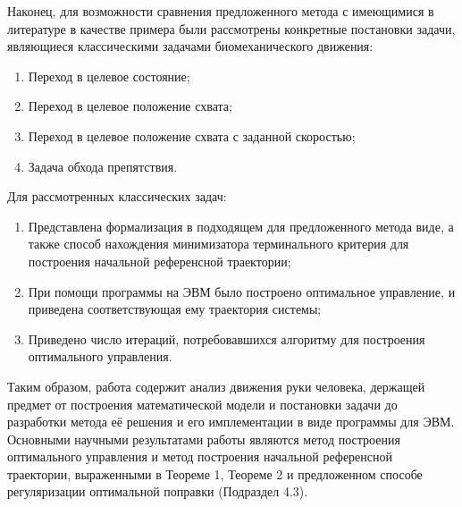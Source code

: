\documentclass[../doc.tex]{subfiles}
\begin{document}
    Наконец, для возможности сравнения предложенного метода с имеющимися в литературе в качестве примера были
        рассмотрены конкретные постановки задачи, являющиеся классическими задачами биомеханического движения:
    \begin{enumerate}\itemsep0em
        \item Переход в целевое состояние;
        \item Переход в целевое положение схвата;
        \item Переход в целевое положение схвата с заданной скоростью;
        \item Задача обхода препятствия.
    \end{enumerate}
    Для рассмотренных классических задач:
    \begin{enumerate}\itemsep0em
        \item Представлена формализация в подходящем для предложенного метода виде,
            а также способ нахождения минимизатора терминального критерия для построения начальной референсной траектории;
        \item При помощи программы на ЭВМ было построено оптимальное управление, и приведена соответствующая ему траектория системы;
        \item Приведено число итераций, потребовавшихся алгоритму для построения оптимального управления.
    \end{enumerate}

    Таким образом, работа содержит анализ движения руки человека, держащей предмет от построения
        математической модели и постановки задачи до разработки метода её решения и его имплементации в виде
        программы для ЭВМ.
    Основными научными результатами работы являются метод построения оптимального управления и метод построения 
        начальной референсной траектории, выраженными в Теореме 1, Теореме 2 и предложенном способе
        регуляризации оптимальной поправки (Подраздел 4.3).

    \ifSubfilesClassLoaded{
        \nocite{*}
        \clearpage
        
        
    }{}
\end{document}
